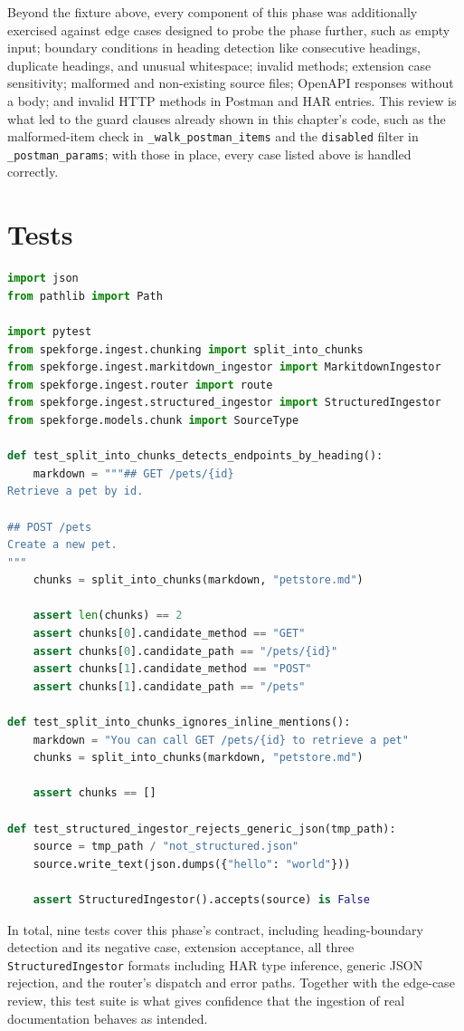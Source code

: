 Beyond the fixture above, every component of this phase was additionally
exercised against edge cases designed to probe the phase further, such as
empty input; boundary conditions in heading detection like consecutive
headings, duplicate headings, and unusual whitespace; invalid methods;
extension case sensitivity; malformed and non-existing source files;
OpenAPI responses without a body; and invalid HTTP methods in Postman and
HAR entries. This review is what led to the guard clauses already shown in
this chapter's code, such as the malformed-item check in
\texttt{\_walk\_postman\_items} and the \texttt{disabled} filter in
\texttt{\_postman\_params}; with those in place, every case listed above
is handled correctly.

\section{Tests}
\begin{lstlisting}[language=Python, caption={\texttt{tests/unit/test\_ingest.py}}]
import json
from pathlib import Path

import pytest
from spekforge.ingest.chunking import split_into_chunks
from spekforge.ingest.markitdown_ingestor import MarkitdownIngestor
from spekforge.ingest.router import route
from spekforge.ingest.structured_ingestor import StructuredIngestor
from spekforge.models.chunk import SourceType

def test_split_into_chunks_detects_endpoints_by_heading():
    markdown = """## GET /pets/{id}
Retrieve a pet by id.

## POST /pets
Create a new pet.
"""
    chunks = split_into_chunks(markdown, "petstore.md")

    assert len(chunks) == 2
    assert chunks[0].candidate_method == "GET"
    assert chunks[0].candidate_path == "/pets/{id}"
    assert chunks[1].candidate_method == "POST"
    assert chunks[1].candidate_path == "/pets"

def test_split_into_chunks_ignores_inline_mentions():
    markdown = "You can call GET /pets/{id} to retrieve a pet"
    chunks = split_into_chunks(markdown, "petstore.md")

    assert chunks == []

def test_structured_ingestor_rejects_generic_json(tmp_path):
    source = tmp_path / "not_structured.json"
    source.write_text(json.dumps({"hello": "world"}))

    assert StructuredIngestor().accepts(source) is False
\end{lstlisting}

In total, nine tests cover this phase's contract, including heading-boundary
detection and its negative case, extension acceptance, all three
\texttt{StructuredIngestor} formats including HAR type inference, generic
JSON rejection, and the router's dispatch and error paths. Together with
the edge-case review, this test suite is what gives confidence that the
ingestion of real documentation behaves as intended.

